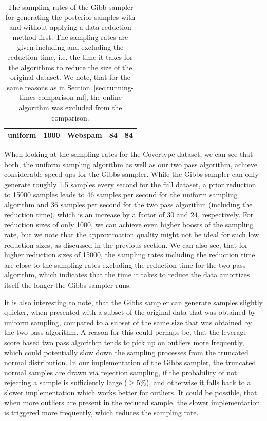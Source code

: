 \begin{table}[t!]
\begin{tabular}{ l | l| l| l| l}
        uniform         & 1000          & Webspam          & 84                                  & 84  \\ \hline
    \end{tabular}
    \caption{The sampling rates of the Gibb sampler for
        generating the posterior samples with and without applying a data
        reduction method first.
        The sampling rates are given including and excluding the
        reduction time, i.e. the time it takes for the algorithms
        to reduce the size of the original dataset.
        We note, that for the same reasons as in
        Section~\ref{sec:running-times-comparison-ml}, the
        online algorithm was excluded from the comparison.}
    \label{tab:running-times-bayes}
\end{table}

When looking at the sampling rates for the Covertype dataset, we can
see that both, the uniform sampling algorithm as well as our
two pass algorithm, achieve considerable speed ups for the Gibbs
sampler. While the Gibbs sampler can only generate roughly
1.5 samples every second for the full dataset, a prior reduction
to 15000 samples leads to 46 samples per second for the uniform
sampling algorithm and 36 samples per second for the two pass
algorithm (including the reduction time),
which is an increase by a factor of 30 and 24, respectively.
For reduction sizes of only 1000, we can achieve even higher
boosts of the sampling rate, but we note that the approximation
quality might not be ideal for such low reduction sizes, as
discussed in the previous section.
We can also see, that for higher reduction sizes of 15000, the
sampling rates including the reduction time are close to the
sampling rates excluding the reduction time for the two pass
algorithm, which indicates that the time it takes to reduce the
data amortizes itself the longer the Gibbs sampler runs.

It is also interesting to note, that the Gibbs sampler can generate
samples slightly quicker, when presented with a subset of the
original data that was obtained
by uniform sampling, compared to a subset of the same size
that was obtained by
the two pass algorithm.
A reason for this could perhaps be, that the leverage score based
two pass algorithm tends to pick up on outliers more frequently,
which could potentially slow down the sampling processes from
the truncated normal distribution.
In our implementation of the Gibbs sampler, the truncated normal
samples are drawn via rejection sampling, if the probability of
not rejecting a sample is sufficiently large ($\geq 5\%$), and otherwise
it falls back to a slower implementation which works better for
outliers. It could be possible, that when more outliers are present
in the reduced sample, the slower implementation is triggered more
frequently, which reduces the sampling rate.

